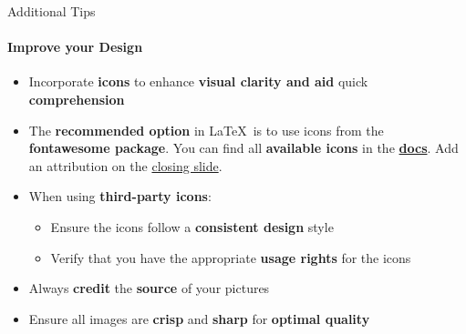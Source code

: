 \documentclass[aspectratio=169]{beamer}
\begin{document}
\begin{frame}
\end{frame}

\begin{frame}{Additional Tips}
    \framesubtitle{Improve your Design}

    \begin{coloredblock}
        \begin{itemize}
            \item Incorporate \textbf{icons} to enhance \textbf{visual clarity and aid }quick \textbf{comprehension}
            \item The \textbf{recommended option} in \LaTeX~is to use icons from the \textbf{fontawesome package}. You can find all \textbf{available icons} in the \href{https://mirror.easyname.at/ctan/fonts/fontawesome5/doc/fontawesome5.pdf}{\textbf{docs}}. Add an attribution on the \hyperlink{frame:closing_slide}{closing slide}.

            \item When using \textbf{third-party icons}:
            \vspace{-0.5\topsep}
            \begin{itemize}
                \item Ensure the icons follow a \textbf{consistent design} style
                \item Verify that you have the appropriate \textbf{usage rights} for the icons
            \end{itemize}
        \end{itemize}
    \end{coloredblock}

        \begin{coloredblock}
            \begin{itemize}
                \item Always \textbf{credit} the \textbf{source} of your pictures
                \item Ensure all images are \textbf{crisp} and \textbf{sharp} for \textbf{optimal quality}
            \end{itemize}
        \end{coloredblock}
\end{frame}
\end{document}

